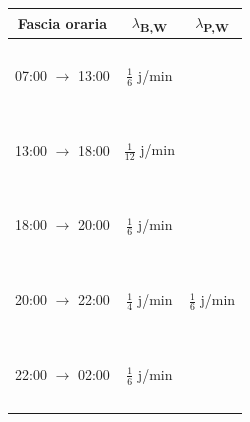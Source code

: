 \documentclass[a4paper, 12pt]{article}
\newcommand{\xmark}[0]{\ding{55}}
\begin{document}
\begin{itemize}
    \begin{table}[!htb]
        \begin{minipage}{.5\linewidth}
          \centering
             
              \begin{tabular}{ |c|c|c| }
                \hline
                \cellcolor{cellcolor} Fascia oraria & \cellcolor{cellcolor}$\lambda${\textsubscript{B,W}} & \cellcolor{cellcolor}$\lambda${\textsubscript{P,W}} \\
                \hline
                \hline
                \ &\ &\ \\
                07:00 $\rightarrow$ 13:00 & $\frac{1}{6}$ j/min & \xmark \\
                \ &\ &\ \\
                \hline
                \ &\ &\ \\
                13:00 $\rightarrow$ 18:00 & $\frac{1}{12}$ j/min & \xmark \\
                \ &\ &\ \\
                \hline
                \ &\ &\ \\
                18:00 $\rightarrow$ 20:00 & $\frac{1}{6}$ j/min & \xmark \\
                \ &\ &\ \\
                \hline
                \ &\ &\ \\
                20:00 $\rightarrow$ 22:00 & $\frac{1}{4}$ j/min & $\frac{1}{6}$ j/min \\
                \ &\ &\ \\
                \hline
                \ &\ &\ \\
                22:00 $\rightarrow$ 02:00 & $\frac{1}{6}$ j/min & \xmark \\
                \ &\ &\ \\
                \hline
              \end{tabular}
              \bigskip
              

\end{minipage}
\end{table}
\end{itemize}
\end{document}
